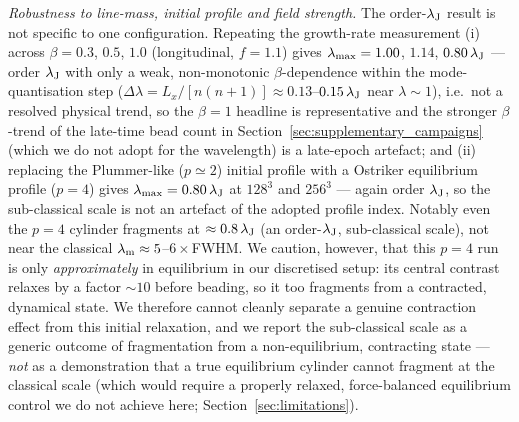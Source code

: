 \documentclass[usenatbib,twoside,twocolumn]{mnras}
\begin{document}
\emph{Robustness to line-mass, initial profile and field strength.} The order-$\lambda_{\rm J}$ result is not specific to one configuration. Repeating the growth-rate measurement (i) across $\beta=0.3$, $0.5$, $1.0$ (longitudinal, $f=1.1$) gives $\lambda_{\rm max}=1.00$, $1.14$, $0.80\,\lambda_{\rm J}$ --- order $\lambda_{\rm J}$ with only a weak, non-monotonic $\beta$-dependence within the mode-quantisation step ($\Delta\lambda=L_x/[n(n{+}1)]\approx0.13$--$0.15\,\lambda_{\rm J}$ near $\lambda\sim1$), i.e.\ not a resolved physical trend, so the $\beta=1$ headline is representative and the stronger $\beta$-trend of the late-time bead count in Section~\ref{sec:supplementary_campaigns} (which we do not adopt for the wavelength) is a late-epoch artefact; and (ii) replacing the Plummer-like ($p\simeq2$) initial profile with a Ostriker equilibrium profile ($p=4$) gives $\lambda_{\rm max}=0.80\,\lambda_{\rm J}$ at $128^3$ and $256^3$ --- again order $\lambda_{\rm J}$, so the sub-classical scale is not an artefact of the adopted profile index. Notably even the $p=4$ cylinder fragments at $\approx0.8\,\lambda_{\rm J}$ (an order-$\lambda_{\rm J}$, sub-classical scale), not near the classical $\lambda_{\rm m}\approx5$--$6\times$FWHM. We caution, however, that this $p=4$ run is only \emph{approximately} in equilibrium in our discretised setup: its central contrast relaxes by a factor $\sim10$ before beading, so it too fragments from a contracted, dynamical state. We therefore cannot cleanly separate a genuine contraction effect from this initial relaxation, and we report the sub-classical scale as a generic outcome of fragmentation from a non-equilibrium, contracting state --- \emph{not} as a demonstration that a true equilibrium cylinder cannot fragment at the classical scale (which would require a properly relaxed, force-balanced equilibrium control we do not achieve here; Section~\ref{sec:limitations}).
\end{document}
